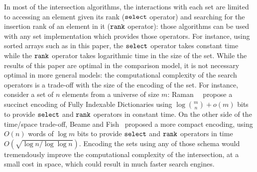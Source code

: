 \def\select{\hbox{\tt select}}
\def\rank{\hbox{\tt rank}}
%
In most of the intersection algorithms, the interactions with each set
are limited to accessing an element given its rank ($\select$ operator)
and searching for the insertion rank of an element in it ($\rank$
operator): those algorithms can be used with any set implementation
which provides those operators.
%
For instance, using sorted arrays such as in this paper, the $\select$
operator takes constant time while the $\rank$ operator takes
logarithmic time in the size of the set.
%
While the results of this paper are optimal in the comparison model,
it is not necessary optimal in more general models: the computational
complexity of the search operators is a trade-off with the size of the
encoding of the set.
%
For instance, consider a set of $n$ elements from a universe of size
$m$:
Raman~\etal~\cite{succinctIndexableDictionariesWithApplicationsToEncodingKAryTreesAndMultisets}
propose a succinct encoding of Fully Indexable Dictionaries using
$\log {m \choose n} + o(m)$ bits to provide $\select$ and $\rank$
operators in constant time.
%
On the other side of the time/space trade-off, Beame and
Fish~\cite{optimalBoundsForThePredecessorProblem} proposed a more
compact encoding, using $O(n)$ words of $\log m$ bits to provide
$\select$ and $\rank$ operators in time $O(\sqrt{ \log n / \log \log
  n})$.
%
Encoding the sets using any of those schema would tremendously improve
the computational complexity of the intersection, at a small cost in
space, which could result in much faster search engines.




